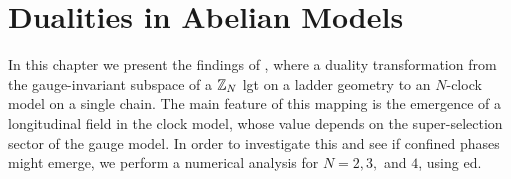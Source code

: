 \chapter{Dualities in Abelian Models}
\label{chap:dualities_in_abelian_models}

In this chapter we present the findings of \cite{pradhan2022ladder}, where a duality transformation from the gauge-invariant subspace of a $\mathbb{Z}_N$ \ac{lgt} on a ladder geometry to an $N$-clock model on a single chain.
The main feature of this mapping is the emergence of a longitudinal field in the clock model, whose value depends on the super-selection sector of the gauge model.
In order to investigate this and see if confined phases might emerge, we perform a numerical analysis for $N = 2, 3,$ and $4$, using \acl{ed}.













